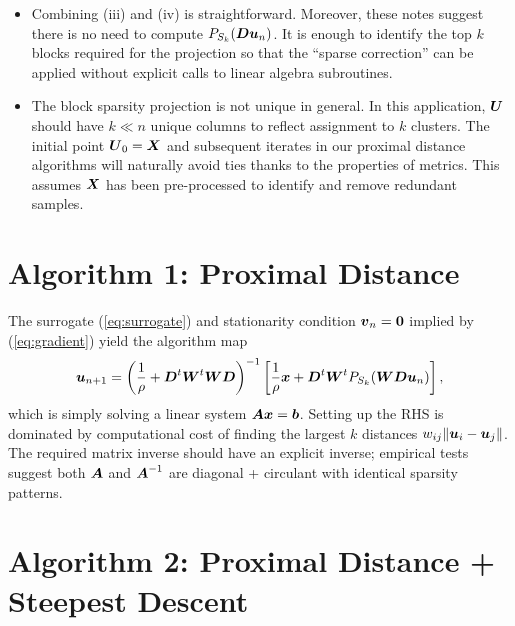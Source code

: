 \documentclass[11pt]{article}
\begin{document}
\begin{itemize}
    \item Combining (iii) and (iv) is straightforward.
    Moreover, these notes suggest there is no need to compute \(P_{S_{k}}(\boldsymbol{D} \boldsymbol{u}_{n})\).
    It is enough to identify the top \(k\) blocks required for the projection so that the ``sparse correction'' can be applied without explicit calls to linear algebra subroutines.

    \item The block sparsity projection is not unique in general.
    In this application, \(\boldsymbol{U}\) should have \(k \ll n\) unique columns to reflect assignment to \(k\) clusters.
    The initial point \(\boldsymbol{U}_{0} = \boldsymbol{X}\) and subsequent iterates in our proximal distance algorithms will naturally avoid ties thanks to the properties of metrics.
    This assumes \(\boldsymbol{X}\) has been pre-processed to identify and remove redundant samples.
\end{itemize}

\section*{\center Algorithm 1: Proximal Distance}

The surrogate (\ref{eq:surrogate}) and stationarity condition \(\boldsymbol{v}_{n} = \boldsymbol{0}\) implied by (\ref{eq:gradient}) yield the algorithm map
\begin{equation*}
    \boldsymbol{u}_{n+1}
    =
    \left(\frac{1}{\rho} + \boldsymbol{D}^{t} \boldsymbol{W}^{t} \boldsymbol{W} \boldsymbol{D}\right)^{-1}
    \left[\frac{1}{\rho} \boldsymbol{x} + \boldsymbol{D}^{t} \boldsymbol{W}^{t} P_{S_{k}}(\boldsymbol{W} \boldsymbol{D} \boldsymbol{u}_{n})\right],
\end{equation*}
which is simply solving a linear system \(\boldsymbol{A} \boldsymbol{x} = \boldsymbol{b}\).
Setting up the RHS is dominated by computational cost of finding the largest \(k\) distances \(w_{ij} \| \boldsymbol{u}_{i} - \boldsymbol{u}_{j} \|\).
The required matrix inverse should have an explicit inverse; empirical tests suggest both \(\boldsymbol{A}\) and \(\boldsymbol{A}^{-1}\) are diagonal + circulant with identical sparsity patterns.

\section*{\center Algorithm 2: Proximal Distance + Steepest Descent}
\end{document}
